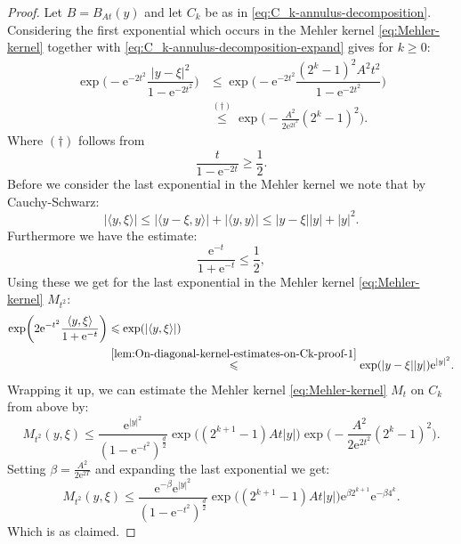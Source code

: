\documentclass[a4paper,oneside,10pt]{amsproc}
\theoremstyle{remark}
\newcommand{\la}{\langle}
\newcommand{\ra}{\rangle}
\renewcommand{\leq}{\leqslant}
\renewcommand{\leq}{\leqslant}
\renewcommand{\geq}{\geqslant}
\newcommand{\e}{\mathrm{e}} %
\renewcommand{\leq}{\leqslant}%
\renewcommand{\geq}{\geqslant}%
\begin{document}
\begin{proof}
  Let $B = B_{At}(y)$ and let $C_k$ be as in
  \eqref{eq:C_k-annulus-decomposition}. Considering the first
  exponential which occurs in the Mehler kernel
  \eqref{eq:Mehler-kernel} together with
  \eqref{eq:C_k-annulus-decomposition-expand} gives for $k \geq 0$:
  \begin{align*}
    \exp\biggl(-\e^{-2t^2} \dfrac{|y - \xi|^2}{1 - \e^{-2t^2}} \biggr)
    &\leq \exp\biggl(-\e^{-2t^2} \dfrac{(2^k - 1)^2 A^2 t^2}{1 - \e^{-2t^2}} \biggr)\\
    &\overset{(\dagger)}{\leq} \exp\biggl(-\frac{A^2}{2 \e^{2t^2}} (2^k - 1)^2 \biggr).
  \end{align*}
  Where $(\dagger)$ follows from
  \begin{equation*}
    \frac{t}{1 - \e^{-2t}} \geq \frac12.
  \end{equation*}
  Before we consider the last exponential in the Mehler kernel we note
  that by Cauchy-Schwarz:
  \begin{equation}
    \label{lem:On-diagonal-kernel-estimates-on-Ck-proof-1}
    |\langle y, \xi \rangle| \leq |\la y - \xi, y \ra| + |\la y, y \ra|
    \leq |y - \xi||y| + |y|^2.
  \end{equation}
  Furthermore we have the estimate:
  \begin{equation*}
    \frac{\e^{-t}}{1 + \e^{-t}} \leq \frac12, 
  \end{equation*}
  Using these we get for the last exponential in the Mehler kernel
  \eqref{eq:Mehler-kernel} $M_{t^2}$:
  \begin{align*}
    \exp\biggl(2\e^{-t^2} \dfrac{\la y, \xi \ra}{1 + \e^{-t}}
    \biggr) &\leq \exp(|\la y, \xi \ra|)\\
    &\stackrel{\eqref{lem:On-diagonal-kernel-estimates-on-Ck-proof-1}}{\leq}
    \exp(|y - \xi||y|) \e^{|y|^2}.
  \end{align*}
  Wrapping it up, we can estimate the Mehler kernel
  \eqref{eq:Mehler-kernel} $M_t$ on $C_k$ from above by:
  \begin{equation*}
    M_{t^2}(y, \xi) \leq \frac{\e^{|y|^2}}{(1 - \e^{-{t^2}})^{\frac{d}2}}
    \exp\bigl((2^{k + 1} - 1) A t |y| \bigr) \exp\biggl(-\frac{A^2}{2 \e^{2t^2}} (2^k - 1)^2 \biggr).
  \end{equation*}
  Setting $\beta = \frac{A^2}{2 \e^{2T}}$ and expanding the last
  exponential we get:
  \begin{equation*}
    M_{t^2}(y, \xi) \leq \frac{\e^{-\beta} \e^{|y|^2}}{(1 - \e^{-{t^2}})^{\frac{d}2}}
    \exp\bigl((2^{k + 1} - 1) A t |y| \bigr) \e^{\beta 2^{k + 1}} \e^{-\beta 4^k}.
  \end{equation*}
  Which is as claimed.


\end{proof}
\end{document}
